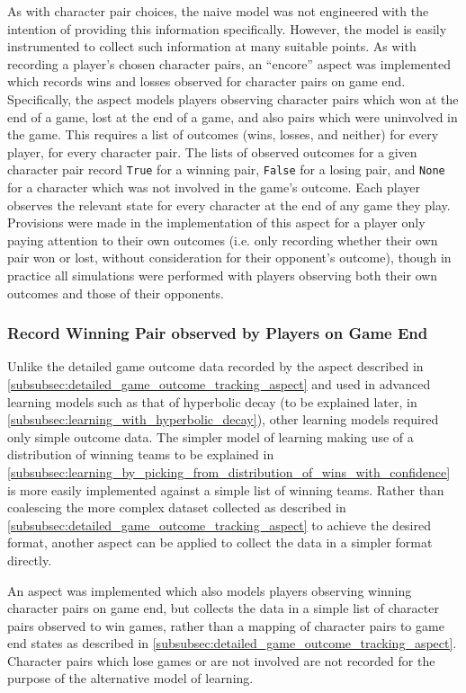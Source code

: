 As with character pair choices, the naive model was not engineered with the
intention of providing this information specifically. However, the model is
easily instrumented to collect such information at many suitable points. As with
recording a player's chosen character pairs, an ``encore'' aspect was
implemented which records wins and losses observed for character pairs on game
end. Specifically, the aspect models players observing character pairs which won
at the end of a game, lost at the end of a game, and also pairs which were
uninvolved in the game. This requires a list of outcomes (wins, losses, and
neither) for every player, for every character pair. The lists of observed
outcomes for a given character pair record \lstinline{True} for a winning pair,
\lstinline{False} for a losing pair, and \lstinline{None} for a character which
was not involved in the game's outcome. Each player observes the relevant state
for every character at the end of any game they play. Provisions were made in
the implementation of this aspect for a player only paying attention to their
own outcomes (i.e. only recording whether their own pair won or lost, without
consideration for their opponent's outcome), though in practice all simulations
were performed with players observing both their own outcomes and those of their
opponents.

\subsubsection{Record Winning Pair observed by Players on Game
End}\label{subsubsec:aspect_to_observe_winning_pair} Unlike the detailed game
outcome data recorded by the aspect described in
\cref{subsubsec:detailed_game_outcome_tracking_aspect} and used in advanced
learning models such as that of hyperbolic decay (to be explained later, in
\cref{subsubsec:learning_with_hyperbolic_decay}), other learning models required
only simple outcome data. The simpler model of learning making use of a
distribution of winning teams to be explained in
\cref{subsubsec:learning_by_picking_from_distribution_of_wins_with_confidence}
is more easily implemented against a simple list of winning teams. Rather than
coalescing the more complex dataset collected as described in
\cref{subsubsec:detailed_game_outcome_tracking_aspect} to achieve the desired
format, another aspect can be applied to collect the data in a simpler format
directly.

An aspect was implemented which also models players observing winning character
pairs on game end, but collects the data in a simple list of character pairs
observed to win games, rather than a mapping of character pairs to game end
states as described in \cref{subsubsec:detailed_game_outcome_tracking_aspect}.
Character pairs which lose games or are not involved are not recorded for the
purpose of the alternative model of learning.

